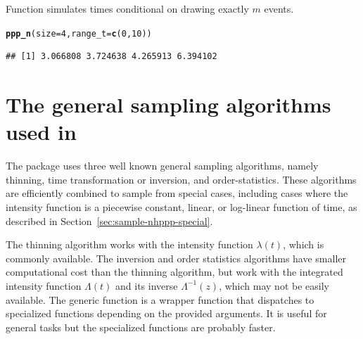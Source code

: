 \documentclass[article,nojss]{jss}\usepackage[]{graphicx}\usepackage[]{xcolor}
\makeatletter
\newcommand{\hlnum}[1]{\textcolor[rgb]{0.686,0.059,0.569}{#1}}%
\newcommand{\hlstd}[1]{\textcolor[rgb]{0.345,0.345,0.345}{#1}}%
\newcommand{\hlkwc}[1]{\textcolor[rgb]{0.333,0.667,0.333}{#1}}%
\newcommand{\hlkwd}[1]{\textcolor[rgb]{0.737,0.353,0.396}{\textbf{#1}}}%
\newenvironment{kframe}{%
 \def\at@end@of@kframe{}%
 \ifinner\ifhmode%
  \def\at@end@of@kframe{\end{minipage}}%
  \begin{minipage}{\columnwidth}%
 \fi\fi%
 \def\FrameCommand##1{\hskip\@totalleftmargin \hskip-\fboxsep
 \colorbox{shadecolor}{##1}\hskip-\fboxsep
     \hskip-\linewidth \hskip-\@totalleftmargin \hskip\columnwidth}%
 \MakeFramed {\advance\hsize-\width
   \@totalleftmargin\z@ \linewidth\hsize
   \@setminipage}}%
 {\par\unskip\endMakeFramed%
 \at@end@of@kframe}
\newenvironment{knitrout}{}{} %
\newcommand{\fct}[1]{\code{#1()}}
\makeatother
\begin{document}
Function \fct{ppp\_n} simulates times conditional on drawing exactly $m$ events.
\begin{knitrout}
\color{fgcolor}\begin{kframe}
\begin{alltt}
\hlkwd{ppp_n}\hlstd{(}\hlkwc{size} \hlstd{=} \hlnum{4}\hlstd{,} \hlkwc{range_t} \hlstd{=} \hlkwd{c}\hlstd{(}\hlnum{0}\hlstd{,} \hlnum{10}\hlstd{))}
\end{alltt}
\begin{verbatim}
## [1] 3.066808 3.724638 4.265913 6.394102
\end{verbatim}
\end{kframe}
\end{knitrout}

\section[The general sampling algorithms used in nhppp]{The general sampling algorithms used in }\label{sec:general-sampling}

The  package uses three well known general sampling algorithms, namely thinning, time transformation or inversion, and order-statistics. These algorithms are efficiently combined to sample from special cases, including cases where the intensity function is a piecewise constant, linear, or log-linear function of time, as described in Section~\ref{sec:sample-nhppp-special}.

The thinning algorithm works with the intensity function $\lambda(t)$, which is commonly available. The inversion and order statistics algorithms have smaller computational cost than the thinning algorithm, but work with the integrated intensity function $\Lambda(t)$ and its inverse $\Lambda^{-1}(z)$, which may not be easily available. The generic function \fct{draw} is a wrapper function that dispatches to specialized functions depending on the provided arguments. It is useful for general tasks but the specialized functions are probably faster.
\end{document}

